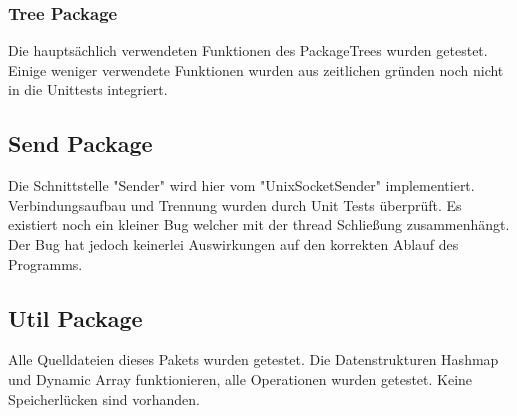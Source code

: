 		\subsubsection{Tree Package}
		Die hauptsächlich verwendeten Funktionen des PackageTrees wurden getestet. Einige weniger verwendete Funktionen wurden aus zeitlichen gründen noch nicht in die Unittests integriert.
	
	\subsection{Send Package}
	Die Schnittstelle "Sender" wird hier vom "UnixSocketSender" implementiert. Verbindungsaufbau und Trennung wurden durch Unit Tests überprüft. Es existiert noch ein kleiner Bug welcher mit der thread Schließung zusammenhängt. Der Bug hat jedoch keinerlei Auswirkungen auf den korrekten Ablauf des Programms.
	
	\subsection{Util Package}
	Alle Quelldateien dieses Pakets wurden getestet. Die Datenstrukturen Hashmap und Dynamic Array funktionieren, alle Operationen wurden getestet. Keine Speicherlücken sind vorhanden.




